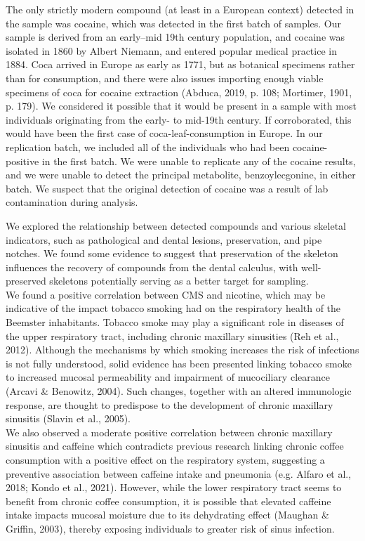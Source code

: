 \documentclass[
  letterpaper,
]{book}
\begin{document}
The only strictly modern compound (at least in a European context)
detected in the sample was cocaine, which was detected in the first
batch of samples. Our sample is derived from an early--mid 19th century
population, and cocaine was isolated in 1860 by Albert Niemann, and
entered popular medical practice in 1884. Coca arrived in Europe as
early as 1771, but as botanical specimens rather than for consumption,
and there were also issues importing enough viable specimens of coca for
cocaine extraction (Abduca, 2019, p. 108; Mortimer, 1901, p. 179). We
considered it possible that it would be present in a sample with most
individuals originating from the early- to mid-19th century. If
corroborated, this would have been the first case of
coca-leaf-consumption in Europe. In our replication batch, we included
all of the individuals who had been cocaine-positive in the first batch.
We were unable to replicate any of the cocaine results, and we were
unable to detect the principal metabolite, benzoylecgonine, in either
batch. We suspect that the original detection of cocaine was a result of
lab contamination during analysis.

We explored the relationship between detected compounds and various
skeletal indicators, such as pathological and dental lesions,
preservation, and pipe notches. We found some evidence to suggest that
preservation of the skeleton influences the recovery of compounds from
the dental calculus, with well-preserved skeletons potentially serving
as a better target for sampling.\\
We found a positive correlation between CMS and nicotine, which may be
indicative of the impact tobacco smoking had on the respiratory health
of the Beemster inhabitants. Tobacco smoke may play a significant role
in diseases of the upper respiratory tract, including chronic maxillary
sinusities (Reh et al., 2012). Although the mechanisms by which smoking
increases the risk of infections is not fully understood, solid evidence
has been presented linking tobacco smoke to increased mucosal
permeability and impairment of mucociliary clearance (Arcavi \&
Benowitz, 2004). Such changes, together with an altered immunologic
response, are thought to predispose to the development of chronic
maxillary sinusitis (Slavin et al., 2005).\\
We also observed a moderate positive correlation between chronic
maxillary sinusitis and caffeine which contradicts previous research
linking chronic coffee consumption with a positive effect on the
respiratory system, suggesting a preventive association between caffeine
intake and pneumonia (e.g. Alfaro et al., 2018; Kondo et al., 2021).
However, while the lower respiratory tract seems to benefit from chronic
coffee consumption, it is possible that elevated caffeine intake impacts
mucosal moisture due to its dehydrating effect (Maughan \& Griffin,
2003), thereby exposing individuals to greater risk of sinus infection.
\end{document}
